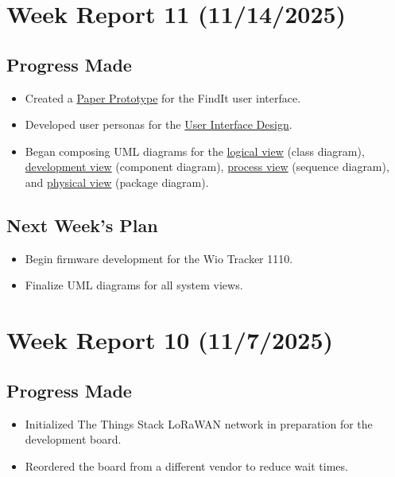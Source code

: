 \section{Week Report 11 (11/14/2025)}
\label{sec:report11}

\subsection{Progress Made}
\begin{itemize}
    \item Created a \hyperref[fig:figmaUI]{Paper Prototype} for the FindIt user interface.
    \item Developed user personas for the \hyperref[Chapter::UserInterfaceDesign]{User Interface Design}.
    \item Began composing UML diagrams for the \hyperref[Chapter::LogicalView]{logical view} (class diagram), \hyperref[Chapter::DevelopmentView]{development view} (component diagram), \hyperref[Chapter::ProcessView]{process view} (sequence diagram), and \hyperref[Chapter::PhysicalView]{physical view} (package diagram).
\end{itemize}

\subsection{Next Week's Plan}
\begin{itemize}
    \item Begin firmware development for the Wio Tracker 1110.
    \item Finalize UML diagrams for all system views.
\end{itemize}


\section{Week Report 10 (11/7/2025)}
\label{sec:report10}

\subsection{Progress Made}
\begin{itemize}
    \item Initialized The Things Stack LoRaWAN network in preparation for the development board.
    \item Reordered the board from a different vendor to reduce wait times.
\end{itemize}

